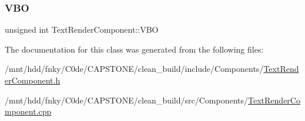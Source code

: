 \mbox{\label{classTextRenderComponent_a5f1d776333e1fb3ea2ba028fde4202f0}} 
\subsubsection{\texorpdfstring{V\+BO}{VBO}}
{\footnotesize\ttfamily unsigned int Text\+Render\+Component\+::\+V\+BO\hspace{0.3cm}{\ttfamily [private]}}



The documentation for this class was generated from the following files\+:\begin{DoxyCompactItemize}
\item 
/mnt/hdd/fnky/\+C0de/\+C\+A\+P\+S\+T\+O\+N\+E/clean\+\_\+build/include/\+Components/\hyperlink{TextRenderComponent_8h}{Text\+Render\+Component.\+h}\item 
/mnt/hdd/fnky/\+C0de/\+C\+A\+P\+S\+T\+O\+N\+E/clean\+\_\+build/src/\+Components/\hyperlink{TextRenderComponent_8cpp}{Text\+Render\+Component.\+cpp}\end{DoxyCompactItemize}
